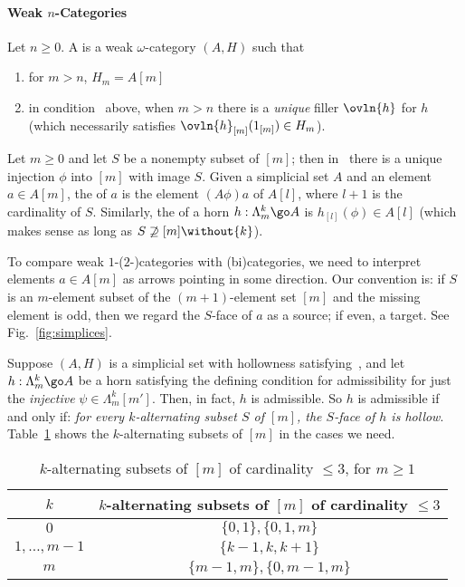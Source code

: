 \paragraph{Weak $n$-Categories}

Let $n\geq 0$.  A  is a weak $\omega$-category
$(A,H)$ such that 
%
\renewcommand{\theenumi}{\roman{enumi}$'$}
%
\begin{enumerate}
\item 	\label{part:high-dims}
for $m > n$, $H_m = A[m]$
\item 	\label{part:unique}
in condition~ above, when $m > n$ there is a
\emph{unique} filler $\ovln{h}$ for $h$ (which necessarily satisfies
$\ovln{h}_{[m]}(1_{[m]}) \in H_m$). 
\end{enumerate}
%
\renewcommand{\theenumi}{\roman{enumi}}




\clearpage





Let $m\geq 0$ and let $S$ be a nonempty subset of $[m]$; then in \Del\ there
is a unique injection $\phi$ into $[m]$ with image $S$.  Given a simplicial
set $A$ and an element $a\in A[m]$, the  of $a$ is the
element $(A\phi)a$ of $A[l]$, where $l+1$ is the cardinality of $S$.
Similarly, the  of a horn $h: \Lambda^k_m \go A$ is
$h_{[l]}(\phi) \in A[l]$ (which makes sense as long as $S \not\supseteq
[m]\without \{k\}$).

To compare weak $1$-($2$-)categories with (bi)categories, we
need to interpret elements $a\in A[m]$ as arrows pointing in some direction.
Our convention is: if $S$ is an $m$-element subset of the
$(m+1)$-element set $[m]$ and the missing element is odd, then we regard the
$S$-face of $a$ as a source; if even, a target.
See Fig.~\ref{fig:simplices}.

Suppose $(A,H)$ is a simplicial set with hollowness
satisfying~, and let $h: \Lambda^k_m \go A$ be a horn
satisfying the defining condition for admissibility for just the
\emph{injective} $\psi\in\Lambda^k_m[m']$.  Then, in fact, $h$ is admissible.
So $h$ is admissible if and only if: \emph{for every $k$-alternating subset
$S$ of $[m]$, the $S$-face of $h$ is hollow}.  Table~\ref{table:alt} shows the
$k$-alternating subsets of $[m]$ in the cases we need.
%
\begin{table}[b]
\centering
\begin{tabular}{c|c}
$k$		&$k$-alternating subsets of $[m]$ of cardinality $\leq 3$\\
\hline
$0$		&$\{0,1\}, \{0,1,m\}$					\\
$1, \ldots, m-1$&$\{k-1,k,k+1\}$					\\
$m$		&$\{m-1,m\}, \{0,m-1,m\}$				
\end{tabular}
%
\caption{$k$-alternating subsets of $[m]$ of cardinality $\leq 3$, for $m\geq
1$} 
\label{table:alt}
\end{table}


